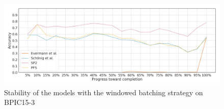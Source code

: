 \begin{figure}[!htb]
    \centering
    \includegraphics[width=\textwidth]{gfx/bpic2015_3/windowed_stability.png}
    \caption{Stability of the models with the windowed batching strategy on BPIC15-3}
    \label{fig:bpic15-3-windowed-stability}
\end{figure}

\FloatBarrier
